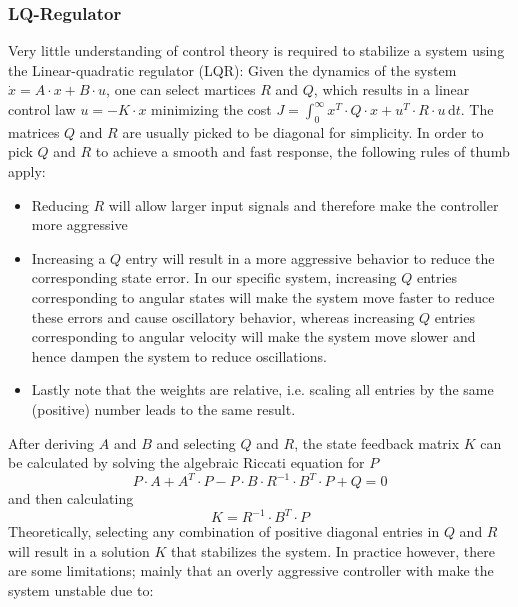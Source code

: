 \documentclass{article}
\begin{document}
\subsubsection{LQ-Regulator}
Very little understanding of control theory is required to stabilize a system using the Linear-quadratic regulator (LQR):
Given the dynamics of the system $\dot{x} = A \cdot x + B \cdot u$, one can select martices $R$ and $Q$, which results in a linear control law $u = -K \cdot x$ minimizing the cost $J = \int_0^{\infty} x^T \cdot Q \cdot x + u^T \cdot R \cdot u \, \mathrm{d}t$.
The matrices $Q$ and $R$ are usually picked to be diagonal for simplicity.
In order to pick $Q$ and $R$ to achieve a smooth and fast response, the following rules of thumb apply:
\begin{itemize}
	\item Reducing $R$ will allow larger input signals and therefore make the controller more aggressive
	\item Increasing a $Q$ entry will result in a more aggressive behavior to reduce the corresponding state error.
	In our specific system, increasing $Q$ entries corresponding to angular states will make the system move faster to reduce these errors and cause oscillatory behavior, whereas increasing $Q$ entries corresponding to angular velocity will make the system move slower and hence dampen the system to reduce oscillations.
	\item Lastly note that the weights are relative, i.e. scaling all entries by the same (positive) number leads to the same result.
\end{itemize}
After deriving $A$ and $B$ and selecting $Q$ and $R$, the state feedback matrix $K$ can be calculated by solving the algebraic Riccati equation for $P$
\begin{equation}
P \cdot A + A^T \cdot P - P \cdot B \cdot R^{-1} \cdot B^T \cdot P + Q = 0
\end{equation}
and then calculating
\begin{equation}
K = R^{-1} \cdot B^T \cdot P
\end{equation}
Theoretically, selecting any combination of positive diagonal entries in $Q$ and $R$ will result in a solution $K$ that stabilizes the system.
In practice however, there are some limitations; mainly that an overly aggressive controller with make the system unstable due to:
\end{document}
